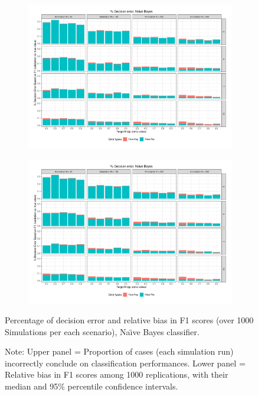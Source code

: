 \documentclass[man, 12pt, a4paper, nolmodern, noextraspace]{apa6}
\begin{document}
\begin{figure}
    \centering
    \begin{subfigure}[t]{0.95\textwidth}
        \centering
        \includegraphics[clip, width=\linewidth, page = 1]{Results/BAYES_summary_05.pdf} 
    \end{subfigure}
    \begin{subfigure}[t]{0.95\textwidth}
        \centering
        \captionsetup{font=small}
        \includegraphics[clip, width=\linewidth, page = 2]{Results/BAYES_summary_05.pdf} 
    \end{subfigure}
    
    \captionsetup{format=hang}
    \caption{Percentage of decision error and relative bias in F1 scores (over 1000 Simulations per each scenario), Na\"{\i}ve Bayes classifier.} 
    \label{fig:Figure2}
    \captionsetup{font=small}
    \caption*{Note: Upper panel = Proportion of cases (each simulation run) incorrectly conclude on classification performances. Lower panel = Relative bias in F1 scores among 1000 replications, with their median and 95\% percentile confidence intervals.}
\end{figure}          
\end{document}
